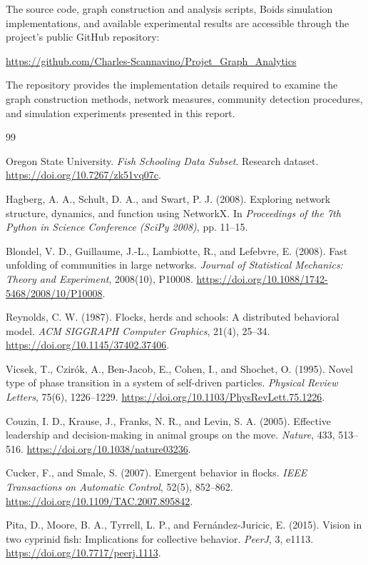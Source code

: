 \documentclass[10pt,a4paper]{article}
\newcommand{\esp}{\vspace*{2\bigskipamount}}
\begin{document}
The source code, graph construction and analysis scripts,
Boids simulation implementations, and available
experimental results are accessible through the
project's public GitHub repository:

\begin{center}
\url{https://github.com/Charles-Scannavino/Projet_Graph_Analytics}
\end{center}

The repository provides the implementation details
required to examine the graph construction methods,
network measures, community detection procedures,
and simulation experiments presented in this report.

\esp

\begin{thebibliography}{99}

Oregon State University.
\textit{Fish Schooling Data Subset}.
Research dataset.
\url{https://doi.org/10.7267/zk51vq07c}.

Hagberg, A. A., Schult, D. A., and Swart, P. J. (2008).
Exploring network structure, dynamics, and function
using NetworkX.
In \textit{Proceedings of the 7th Python in Science
Conference (SciPy 2008)}, pp. 11--15.

Blondel, V. D., Guillaume, J.-L., Lambiotte, R.,
and Lefebvre, E. (2008).
Fast unfolding of communities in large networks.
\textit{Journal of Statistical Mechanics:
Theory and Experiment}, 2008(10), P10008.
\url{https://doi.org/10.1088/1742-5468/2008/10/P10008}.

Reynolds, C. W. (1987).
Flocks, herds and schools:
A distributed behavioral model.
\textit{ACM SIGGRAPH Computer Graphics},
21(4), 25--34.
\url{https://doi.org/10.1145/37402.37406}.

Vicsek, T., Czir\'ok, A., Ben-Jacob, E.,
Cohen, I., and Shochet, O. (1995).
Novel type of phase transition in a system
of self-driven particles.
\textit{Physical Review Letters},
75(6), 1226--1229.
\url{https://doi.org/10.1103/PhysRevLett.75.1226}.

Couzin, I. D., Krause, J., Franks, N. R.,
and Levin, S. A. (2005).
Effective leadership and decision-making
in animal groups on the move.
\textit{Nature}, 433, 513--516.
\url{https://doi.org/10.1038/nature03236}.

Cucker, F., and Smale, S. (2007).
Emergent behavior in flocks.
\textit{IEEE Transactions on Automatic Control},
52(5), 852--862.
\url{https://doi.org/10.1109/TAC.2007.895842}.

Pita, D., Moore, B. A., Tyrrell, L. P.,
and Fern\'andez-Juricic, E. (2015).
Vision in two cyprinid fish:
Implications for collective behavior.
\textit{PeerJ}, 3, e1113.
\url{https://doi.org/10.7717/peerj.1113}.

\end{thebibliography}
\end{document}

